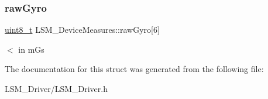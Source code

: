 \subsubsection{\texorpdfstring{raw\+Gyro}{rawGyro}}
{\footnotesize\ttfamily \hyperlink{vl53l0x__types_8h_aba7bc1797add20fe3efdf37ced1182c5}{uint8\+\_\+t} L\+S\+M\+\_\+\+Device\+Measures\+::raw\+Gyro\mbox{[}6\mbox{]}}

$<$ in mG\textquotesingle{}s 

The documentation for this struct was generated from the following file\+:\begin{DoxyCompactItemize}
\item 
L\+S\+M\+\_\+\+Driver/L\+S\+M\+\_\+\+Driver.\+h\end{DoxyCompactItemize}
